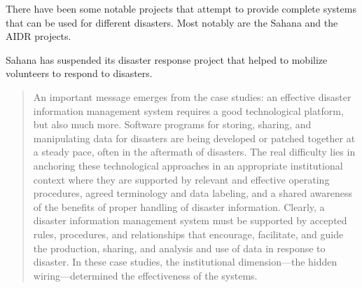 There have been some notable projects that attempt to provide complete systems
that can be used for different disasters. Most notably are the Sahana and the
AIDR projects.

Sahana has suspended its disaster response project that helped to
mobilize volunteers to respond to disasters.
  
\begin{quote}
An important message emerges from the case studies: an effective disaster
information management system requires a good technological platform,
but also much more. Software programs for storing, sharing, and manipulating
data for disasters are being developed or patched together at a steady pace,
often in the aftermath of disasters. The real difficulty lies in anchoring
these technological approaches in an appropriate institutional context where
they are supported by relevant and effective operating procedures, agreed
terminology and data labeling, and a shared awareness of the benefits of proper
handling of disaster information. Clearly, a disaster information management
system must be supported by accepted rules, procedures, and relationships
that encourage, facilitate, and guide the production, sharing, and analysis and
use of data in response to disaster. In these case studies, the institutional
dimension---the hidden wiring---determined the effectiveness of the
systems.~\cite{aminDataNaturalDisasters2008}
\end{quote}

